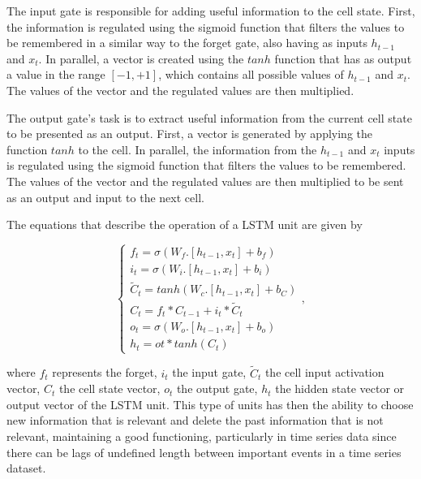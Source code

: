 The input gate is responsible for adding useful information to the cell state. First, the information is regulated using the sigmoid function that filters the values to be remembered in a similar way to the forget gate, also having as inputs $h_{t-1}$ and $x_t$. In parallel, a vector is created using the $tanh$ function that has as output a value in the range $ [-1, +1]$, which contains all possible values of $h_{t-1}$ and $x_t$. The values of the vector and the regulated values are then multiplied. 

The output gate's task is to extract useful information from the current cell state to be presented as an output. First, a vector is generated by applying the function $tanh$ to the cell. In parallel, the information from the $h_{t-1}$ and $x_t$ inputs is regulated using the sigmoid function that filters the values to be remembered. The values of the vector and the regulated values are then multiplied to be sent as an output and input to the next cell.

 


The equations that describe the operation of a \ac{LSTM} unit are given by 

\begin{equation}
    \begin{cases} 
        
        f_t=\sigma(W_f.[h_{t-1},x_t] + b_f)\\
        i_t=\sigma(W_i.[h_{t-1},x_t] + b_i)\\
        \widetilde{C}_t = tanh(W_c.[h_{t-1},x_t] + b_C)\\
        C_t=f_t*C_{t-1}+i_t* \widetilde{C}_t\\
        o_t=\sigma(W_o.[h_{t-1},x_t] + b_o)\\
        h_t=ot*tanh(C_t)
        
         
    \end{cases} ,
\end{equation}

where $f_t$ represents the forget, $i_t$ the input gate, $\widetilde{C}_t$ the cell input activation vector, ${C}_t$ the cell state vector, $o_t$ the output gate, $h_t$ the hidden state vector or output vector of the \ac{LSTM} unit. This type of units has then the ability to choose new information that is relevant and delete the past information that is not relevant, maintaining a good functioning, particularly in time series data since there can be lags of undefined length between important events in a time series dataset.

